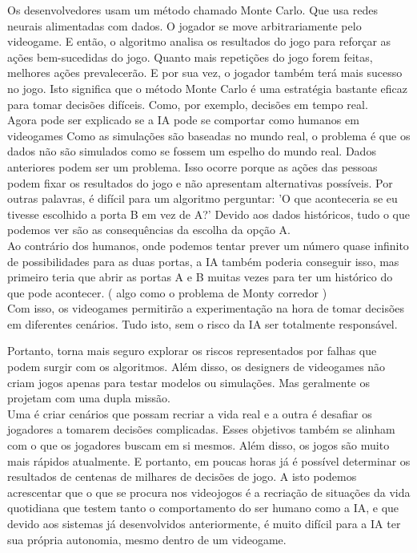 \documentclass[a4paper]{report}
\begin{document}
Os desenvolvedores usam um método chamado Monte Carlo. Que usa redes neurais alimentadas com dados. O jogador se move arbitrariamente pelo videogame. E então, o algoritmo analisa os resultados do jogo para reforçar as ações bem-sucedidas do jogo. Quanto mais repetições do jogo forem feitas, melhores ações prevalecerão. E por sua vez, o jogador também terá mais sucesso no jogo. Isto significa que o método Monte Carlo é uma estratégia bastante eficaz para tomar decisões difíceis. Como, por exemplo, decisões em tempo real.\\  
    
Agora pode ser explicado se a \ac{IA} pode se comportar como humanos em videogames
Como as simulações são baseadas no mundo real, o problema é que os dados não são simulados como se fossem um espelho do mundo real. Dados anteriores podem ser um problema. Isso ocorre porque as ações das pessoas podem fixar os resultados do jogo e não apresentam alternativas possíveis. Por outras palavras, é difícil para um algoritmo perguntar: 'O que aconteceria se eu tivesse escolhido a porta B em vez de A?' Devido aos dados históricos, tudo o que podemos ver são as consequências da escolha da opção A.\\
    
Ao contrário dos humanos, onde podemos tentar prever um número quase infinito de possibilidades para as duas portas, a \ac{IA} também poderia conseguir isso, mas primeiro teria que abrir as portas A e B muitas vezes para ter um histórico do que pode acontecer. ( algo como o problema de Monty corredor  )\\
    
Com isso, os videogames permitirão a experimentação na hora de tomar decisões em diferentes cenários. Tudo isto, sem o risco da \ac{IA} ser totalmente responsável. 
    
Portanto, torna mais seguro explorar os riscos representados por falhas que podem surgir com os algoritmos. Além disso, os designers de videogames não criam jogos apenas para testar modelos ou simulações. Mas geralmente os projetam com uma dupla missão.\\
    
Uma é criar cenários que possam recriar a vida real e a outra é desafiar os jogadores a tomarem decisões complicadas. Esses objetivos também se alinham com o que os jogadores buscam em si mesmos. Além disso, os jogos são muito mais rápidos atualmente. E portanto, em poucas horas já é possível determinar os resultados de centenas de milhares de decisões de jogo.
A isto podemos acrescentar que o que se procura nos videojogos é a recriação de situações da vida quotidiana que testem tanto o comportamento do ser humano como a \ac{IA}, e que devido aos sistemas já desenvolvidos anteriormente, é muito difícil para a \ac{IA} ter sua própria autonomia, mesmo dentro de um videogame.
\end{document}
